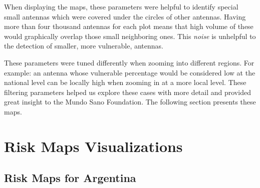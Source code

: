 When displaying the maps, these parameters were helpful to identify special small antennas which were covered under the circles of other antennas.
Having more than four thousand antennas for each plot means that high volume of these would graphically overlap those small neighboring ones.
This \textit{noise} is unhelpful to the detection of smaller, more vulnerable, antennas.

These parameters were tuned differently when zooming into different regions.
For example: an antenna whose vulnerable percentage would be considered low at the national level can be locally high when zooming in at a more local level.
These filtering parameters helped us explore these cases with more detail and provided great insight to the Mundo Sano Foundation.
The following section presents these maps.

\section{Risk Maps Visualizations}\label{section:riskmaps}

\subsection{Risk Maps for Argentina}


